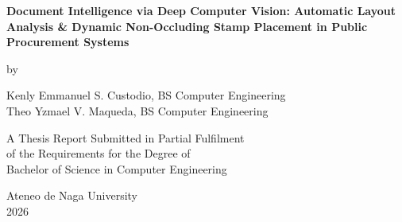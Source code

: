 \begin{titlepage}
\begin{center}
\begingroup
\singlespacing
\setlength{\parindent}{0pt}
\vspace*{5\baselineskip}

{\fontsize{20pt}{24pt}\selectfont\textbf{Document Intelligence via Deep Computer Vision: Automatic Layout Analysis \& Dynamic Non-Occluding Stamp Placement in Public Procurement Systems}\par}

\vspace{8\baselineskip}

{\fontsize{14pt}{18pt}\selectfont by\par}

\vspace{1\baselineskip}

{\fontsize{14pt}{18pt}\selectfont
Kenly Emmanuel S. Custodio, BS Computer Engineering \\
Theo Yzmael V. Maqueda, BS Computer Engineering\par
}

\vspace{7\baselineskip}

{\fontsize{14pt}{18pt}\selectfont
A Thesis Report Submitted in Partial Fulfilment \\
of the Requirements for the Degree of \\
Bachelor of Science in Computer Engineering\par
}

\vspace{7\baselineskip}

{\fontsize{14pt}{18pt}\selectfont
Ateneo de Naga University \\
2026\par
}

\endgroup
\end{center}
\end{titlepage}
